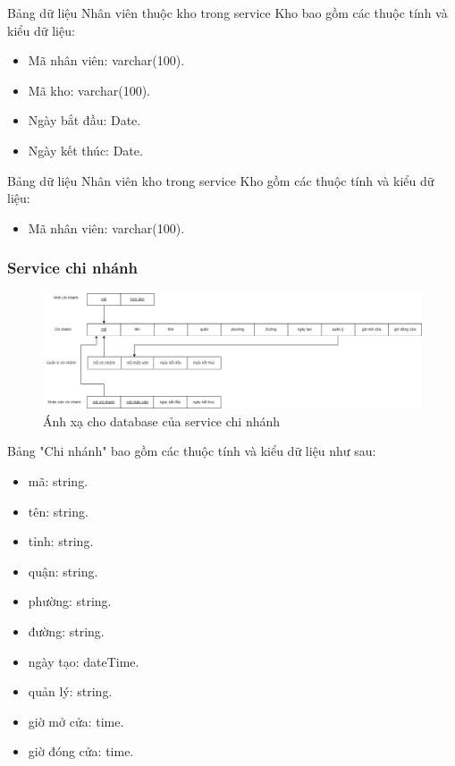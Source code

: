 Bảng dữ liệu Nhân viên thuộc kho trong service Kho bao gồm các thuộc tính và kiểu dữ liệu:
\begin{itemize}
	\item Mã nhân viên: varchar(100).
	\item Mã kho: varchar(100).
	\item Ngày bắt đầu: Date.
	\item Ngày kết thúc: Date.
\end{itemize}

Bảng dữ liệu Nhân viên kho trong service Kho gồm các thuộc tính và kiểu dữ liệu:
\begin{itemize}
	\item Mã nhân viên: varchar(100).
\end{itemize}







\subsubsection{Service chi nhánh}
\begin{figure}[!htp]
	\begin{center}
		\includegraphics[width=1\textwidth]{img/database/mapping/branch.png}
		\newline
		\caption{Ánh xạ cho database của service chi nhánh}
	\end{center}
\end{figure}

Bảng "Chi nhánh" bao gồm các thuộc tính và kiểu dữ liệu như sau:
\begin{itemize}
	\item mã: string.
	\item tên: string.
	\item tỉnh: string.
	\item quận: string.
	\item phường: string.
	\item đường: string.
	\item ngày tạo: dateTime.
	\item quản lý: string.
	\item giờ mở cửa: time.
	\item giờ đóng cửa: time.
\end{itemize}

